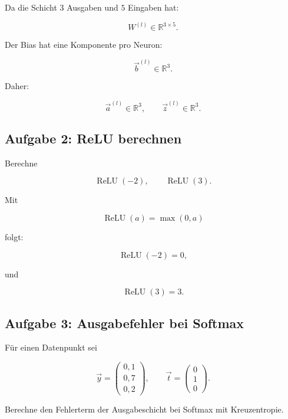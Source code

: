 \begin{examplebox}
Da die Schicht \(3\) Ausgaben und \(5\) Eingaben hat:

\[
    W^{(l)}\in\mathbb{R}^{3\times 5}.
\]

Der Bias hat eine Komponente pro Neuron:

\[
    \vec{b}^{(l)}\in\mathbb{R}^{3}.
\]

Daher:

\[
    \vec{a}^{(l)}\in\mathbb{R}^{3},
    \qquad
    \vec{z}^{(l)}\in\mathbb{R}^{3}.
\]
\end{examplebox}

\subsection{Aufgabe 2: ReLU berechnen}

Berechne

\[
    \operatorname{ReLU}(-2),
    \qquad
    \operatorname{ReLU}(3).
\]

\begin{examplebox}
Mit

\[
    \operatorname{ReLU}(a)=\max(0,a)
\]

folgt:

\[
    \operatorname{ReLU}(-2)=0,
\]

und

\[
    \operatorname{ReLU}(3)=3.
\]
\end{examplebox}

\subsection{Aufgabe 3: Ausgabefehler bei Softmax}

Für einen Datenpunkt sei

\[
    \vec{y}
    =
    \begin{pmatrix}
        0{,}1 \\
        0{,}7 \\
        0{,}2
    \end{pmatrix},
    \qquad
    \vec{t}
    =
    \begin{pmatrix}
        0 \\
        1 \\
        0
    \end{pmatrix}.
\]

Berechne den Fehlerterm der Ausgabeschicht bei Softmax mit Kreuzentropie.

